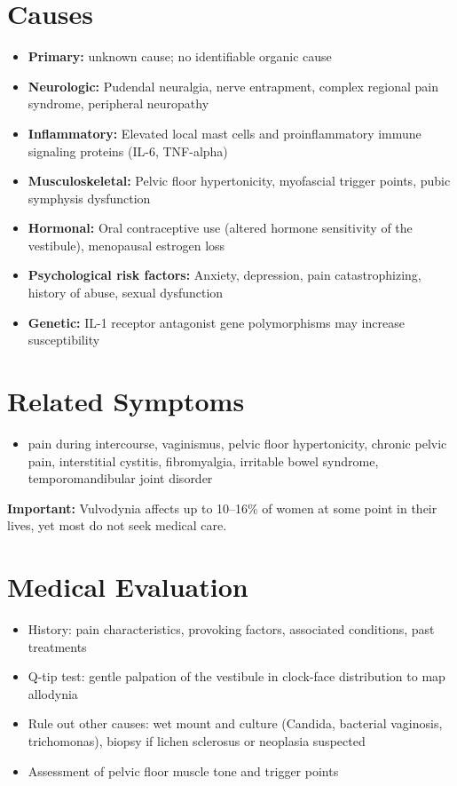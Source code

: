 \section*{Causes}
\begin{itemize}
  \item \textbf{Primary:} unknown cause; no identifiable organic cause
  \item \textbf{Neurologic:} Pudendal neuralgia, nerve entrapment, complex regional pain syndrome, peripheral neuropathy
  \item \textbf{Inflammatory:} Elevated local mast cells and proinflammatory immune signaling proteins (IL-6, TNF-alpha)
  \item \textbf{Musculoskeletal:} Pelvic floor hypertonicity, myofascial trigger points, pubic symphysis dysfunction
  \item \textbf{Hormonal:} Oral contraceptive use (altered hormone sensitivity of the vestibule), menopausal estrogen loss
  \item \textbf{Psychological risk factors:} Anxiety, depression, pain catastrophizing, history of abuse, sexual dysfunction
  \item \textbf{Genetic:} IL-1 receptor antagonist gene polymorphisms may increase susceptibility
\end{itemize}

\section*{Related Symptoms}
\begin{itemize}
  \item pain during intercourse, vaginismus, pelvic floor hypertonicity, chronic pelvic pain, interstitial cystitis, fibromyalgia, irritable bowel syndrome, temporomandibular joint disorder
\end{itemize}
\textbf{Important:} Vulvodynia affects up to 10--16\% of women at some point in their lives, yet most do not seek medical care.

\section*{Medical Evaluation}
\begin{itemize}
  \item History: pain characteristics, provoking factors, associated conditions, past treatments
  \item Q-tip test: gentle palpation of the vestibule in clock-face distribution to map allodynia
  \item Rule out other causes: wet mount and culture (Candida, bacterial vaginosis, trichomonas), biopsy if lichen sclerosus or neoplasia suspected
  \item Assessment of pelvic floor muscle tone and trigger points
\end{itemize}

